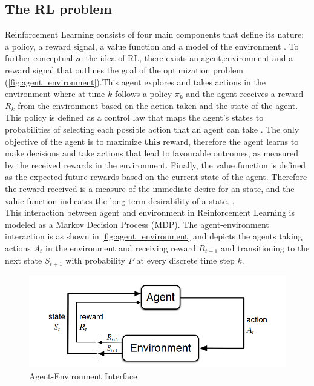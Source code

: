 \subsection{The RL problem}
Reinforcement Learning consists of four main components that define its nature: a policy, a reward signal, a value function and a model of the environment \cite{suttonReinforcementLearningIntroduction2014}. To further conceptualize the idea of RL, there exists an agent,environment and a reward signal that outlines the goal of the optimization problem (\autoref{fig:agent_environment}).This agent explores and takes actions in the environment where at time $k$ follows a policy $\pi_{k}$ and the agent receives a reward $R_{k}$ from the environment based on the action taken and the state of the agent. This policy is defined as a control law that maps the agent's states to probabilities of selecting each possible action that an agent can take \cite{suttonReinforcementLearningIntroduction2014}. The only objective of the agent is to maximize \textbf{this} reward, therefore the agent learns to make decisions and take actions that lead to favourable outcomes, as measured by the received rewards in the environment. Finally, the value function is defined as the expected future rewards based on the current state of the agent. Therefore the reward received is a measure of the immediate desire for an state, and the value function indicates the long-term desirability of a state. \cite{suttonReinforcementLearningIntroduction2014}.\\

This interaction between agent and environment in Reinforcement Learning is modeled as a Markov Decision Process (MDP). The agent-environment interaction is as shown in \autoref{fig:agent_environment} and depicts the agents taking actions $A_t$ in the environment and receiving reward $R_{t+1}$ and transitioning to the next state $S_{t+1}$ with probability $P$ at every discrete time step $k$.



\begin{figure}[h]
	\centering
	\includegraphics[width=0.75\linewidth]{figures/agent-environment.png}
	\caption{Agent-Environment Interface \cite{suttonReinforcementLearningIntroduction2014}}
	\label{fig:agent_environment}
\end{figure}

